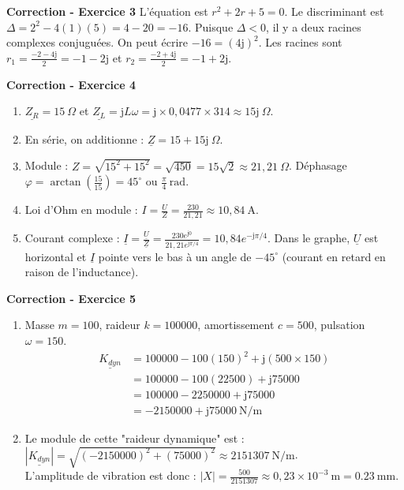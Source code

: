 \documentclass[11pt,a4paper]{article}
\newcommand{\jc}{\mathrm{j}} %
\newcommand{\cpx}[1]{\underline{#1}} %
\begin{document}
\vspace{0.5cm}
\textbf{Correction - Exercice 3}
L'équation est $r^2 + 2r + 5 = 0$. Le discriminant est $\Delta = 2^2 - 4(1)(5) = 4 - 20 = -16$.
Puisque $\Delta < 0$, il y a deux racines complexes conjuguées. On peut écrire $-16 = (4\jc)^2$.
Les racines sont $r_1 = \frac{-2 - 4\jc}{2} = -1 - 2\jc$ et $r_2 = \frac{-2 + 4\jc}{2} = -1 + 2\jc$.

\vspace{0.5cm}
\textbf{Correction - Exercice 4}
\begin{enumerate}
    \item $\cpx{Z_R} = 15\ \Omega$ et $\cpx{Z_L} = \jc L\omega = \jc \times 0,0477 \times 314 \approx 15\jc\ \Omega$.
    \item En série, on additionne : $\cpx{Z} = 15 + 15\jc\ \Omega$.
    \item Module : $Z = \sqrt{15^2 + 15^2} = \sqrt{450} = 15\sqrt{2} \approx 21,21\ \Omega$. Déphasage $\varphi = \arctan(\frac{15}{15}) = 45^\circ$ ou $\frac{\pi}{4}\ \text{rad}$.
    \item Loi d'Ohm en module : $I = \frac{U}{Z} = \frac{230}{21,21} \approx 10,84\ \text{A}$.
    \item Courant complexe : $\cpx{I} = \frac{\cpx{U}}{\cpx{Z}} = \frac{230 e^{\jc 0}}{21,21 e^{\jc \pi/4}} = 10,84 e^{-\jc \pi/4}$. Dans le graphe, $\cpx{U}$ est horizontal et $\cpx{I}$ pointe vers le bas à un angle de $-45^\circ$ (courant en retard en raison de l'inductance).
\end{enumerate}

\vspace{0.5cm}
\textbf{Correction - Exercice 5}
\begin{enumerate}
    \item Masse $m=100$, raideur $k=100000$, amortissement $c=500$, pulsation $\omega = 150$.
    \begin{align*}
        \cpx{K_{dyn}} &= 100000 - 100(150)^2 + \jc(500 \times 150) \\
                      &= 100000 - 100(22500) + \jc 75000 \\
                      &= 100000 - 2250000 + \jc 75000 \\
                      &= -2150000 + \jc 75000 \ \text{N/m}
    \end{align*}
    \item Le module de cette "raideur dynamique" est : $|\cpx{K_{dyn}}| = \sqrt{(-2150000)^2 + (75000)^2} \approx 2151307\ \text{N/m}$. \\
    L'amplitude de vibration est donc : $|X| = \frac{500}{2151307} \approx 0,23 \times 10^{-3}\ \text{m} = \SI{0.23}{\milli\meter}$.
\end{enumerate}
\end{document}
